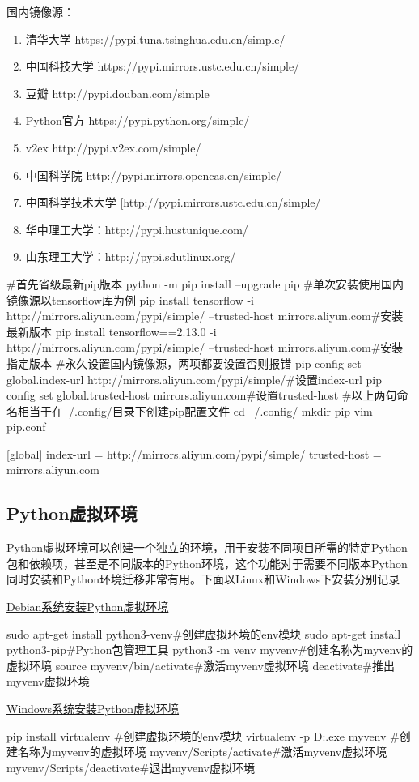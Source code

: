 国内镜像源：
\begin{enumerate}
	\item 清华大学 https://pypi.tuna.tsinghua.edu.cn/simple/
	\item 中国科技大学 https://pypi.mirrors.ustc.edu.cn/simple/
	\item 豆瓣 http://pypi.douban.com/simple
	\item Python官方 https://pypi.python.org/simple/
	\item v2ex http://pypi.v2ex.com/simple/
	\item 中国科学院 http://pypi.mirrors.opencas.cn/simple/
	\item 中国科学技术大学 [http://pypi.mirrors.ustc.edu.cn/simple/
	\item 华中理工大学：http://pypi.hustunique.com/
	\item 山东理工大学：http://pypi.sdutlinux.org/
\end{enumerate}
\begin{shell}
#首先省级最新pip版本
python -m pip install --upgrade pip
#单次安装使用国内镜像源以tensorflow库为例
pip install tensorflow -i http://mirrors.aliyun.com/pypi/simple/ --trusted-host mirrors.aliyun.com#安装最新版本
pip install tensorflow==2.13.0 -i http://mirrors.aliyun.com/pypi/simple/ --trusted-host mirrors.aliyun.com#安装指定版本
#永久设置国内镜像源，两项都要设置否则报错
pip config set global.index-url http://mirrors.aliyun.com/pypi/simple/#设置index-url
pip config set global.trusted-host mirrors.aliyun.com#设置trusted-host
#以上两句命名相当于在~/.config/目录下创建pip配置文件
cd ~/.config/
mkdir pip
vim pip.conf

[global]
index-url = http://mirrors.aliyun.com/pypi/simple/
trusted-host = mirrors.aliyun.com
\end{shell}
\subsection{Python虚拟环境}
Python虚拟环境可以创建一个独立的环境，用于安装不同项目所需的特定Python包和依赖项，甚至是不同版本的Python环境，这个功能对于需要不同版本Python同时安装和Python环境迁移非常有用。下面以Linux和Windows下安装分别记录

\href{https://blog.csdn.net/qq_34444097/article/details/142733302?spm=1001.2014.3001.5506}{Debian系统安装Python虚拟环境}
\begin{shell}
sudo apt-get install python3-venv#创建虚拟环境的env模块
sudo apt-get install python3-pip#Python包管理工具
python3 -m venv myvenv#创建名称为myvenv的虚拟环境
source myvenv/bin/activate#激活myvenv虚拟环境
deactivate#推出myvenv虚拟环境
\end{shell}
\href{https://blog.csdn.net/cl_kleiber0802/article/details/142006096?spm=1001.2014.3001.5506}{Windows系统安装Python虚拟环境}
\begin{shell}
pip install virtualenv #创建虚拟环境的env模块
virtualenv -p D:\Python{}\Python.exe myvenv
#创建名称为myvenv的虚拟环境
myvenv/Scripts/activate#激活myvenv虚拟环境
myvenv/Scripts/deactivate#退出myvenv虚拟环境
\end{shell}
